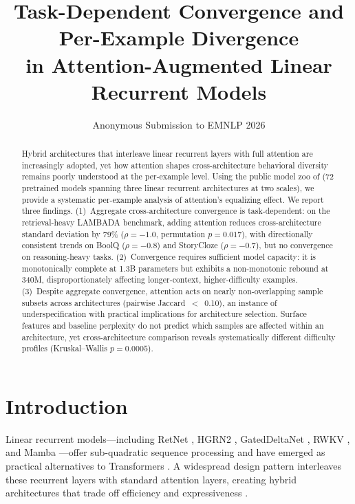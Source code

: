 \documentclass[11pt,twocolumn]{article}
\title{Task-Dependent Convergence and Per-Example Divergence\\in Attention-Augmented Linear Recurrent Models}
\author{
Anonymous Submission to EMNLP 2026
}
\date{}
\begin{document}
\maketitle

\begin{abstract}
Hybrid architectures that interleave linear recurrent layers with full attention are increasingly adopted, yet how attention shapes cross-architecture behavioral diversity remains poorly understood at the per-example level.
Using the public model zoo of \citet{wang2025mamba} (72 pretrained models spanning three linear recurrent architectures at two scales), we provide a systematic per-example analysis of attention's equalizing effect.
We report three findings.
(1)~Aggregate cross-architecture convergence is task-dependent: on the retrieval-heavy LAMBADA benchmark, adding attention reduces cross-architecture standard deviation by 79\% ($\rho{=}{-}1.0$, permutation $p{=}0.017$), with directionally consistent trends on BoolQ ($\rho{=}{-}0.8$) and StoryCloze ($\rho{=}{-}0.7$), but no convergence on reasoning-heavy tasks.
(2)~Convergence requires sufficient model capacity: it is monotonically complete at 1.3B parameters but exhibits a non-monotonic rebound at 340M, disproportionately affecting longer-context, higher-difficulty examples.
(3)~Despite aggregate convergence, attention acts on nearly non-overlapping sample subsets across architectures (pairwise Jaccard~$<$~0.10), an instance of underspecification with practical implications for architecture selection.
Surface features and baseline perplexity do not predict which samples are affected within an architecture, yet cross-architecture comparison reveals systematically different difficulty profiles (Kruskal--Wallis $p{=}0.0005$).
\end{abstract}

\section{Introduction}

Linear recurrent models---including RetNet \citep{sun2023retentive}, HGRN2 \citep{qin2024hgrn2}, GatedDeltaNet \citep{yang2024gated}, RWKV \citep{peng2023rwkv}, and Mamba \citep{gu2023mamba}---offer sub-quadratic sequence processing and have emerged as practical alternatives to Transformers \citep{vaswani2017attention}.
A widespread design pattern interleaves these recurrent layers with standard attention layers, creating hybrid architectures that trade off efficiency and expressiveness \citep{lieber2024jamba,de2024griffin}.
\end{document}
